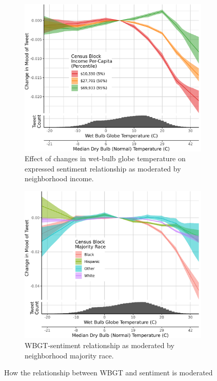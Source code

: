 \documentclass{article}
\begin{document}
\begin{figure}[H]
\centering
\begin{subfigure}{.5\textwidth}
  \centering
  \includegraphics[width=\linewidth]{../res/wbgt-income.png}
  \caption{Effect of changes in wet-bulb globe temperature on expressed sentiment relationship as moderated by neighborhood income.}
  \label{fig:sub1}
\end{subfigure}%
\begin{subfigure}{.5\textwidth}
  \centering
  \includegraphics[width=\linewidth]{../res/wbgt-race_q.png}
  \caption{WBGT-sentiment relationship as moderated by neighborhood majority race.}
  \label{fig:sub2}
\end{subfigure}
\caption{How the relationship between WBGT and sentiment is moderated }
\label{fig:test}
\end{figure}
\end{document}
